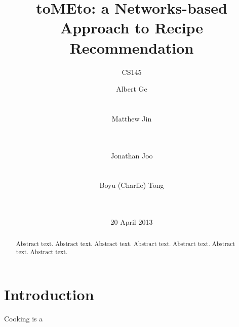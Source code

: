 \documentclass{acm_proc_article-sp}
\begin{document}
\title{toMEto: a Networks-based Approach to Recipe Recommendation}
\subtitle{CS145}


\makeatletter
\def\BState{\State\hskip-\ALG@thistlm}
\makeatother


\author{
\alignauthor
Albert Ge\\
       \\
       \\
\alignauthor
Matthew Jin\\
       \\
       \\
\and %
\alignauthor
Jonathan Joo\\
       \\
       \\
\alignauthor
Boyu (Charlie) Tong\\
       \\
       \\
}

\date{20 April 2013}


\maketitle
\begin{abstract}
Abstract text. Abstract text. Abstract text. Abstract text. Abstract text. Abstract text. Abstract text. 
\end{abstract}




\section{Introduction}
Cooking is a 
\end{document}
